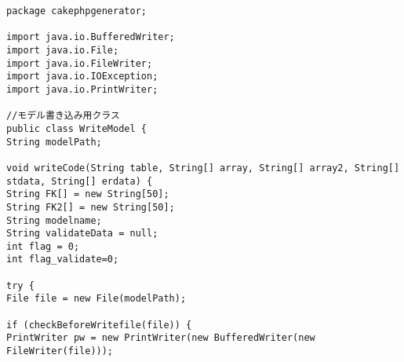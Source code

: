\documentclass{funthesis}
\begin{document}
\begin{lstlisting}[caption=WriteModel .java,label=1]
package cakephpgenerator;

import java.io.BufferedWriter;
import java.io.File;
import java.io.FileWriter;
import java.io.IOException;
import java.io.PrintWriter;

//モデル書き込み用クラス
public class WriteModel {
String modelPath;

void writeCode(String table, String[] array, String[] array2, String[] stdata, String[] erdata) {
String FK[] = new String[50];
String FK2[] = new String[50];
String modelname;
String validateData = null;
int flag = 0;
int flag_validate=0;

try {
File file = new File(modelPath);

if (checkBeforeWritefile(file)) {
PrintWriter pw = new PrintWriter(new BufferedWriter(new FileWriter(file)));


\end{lstlisting}
\end{document}
